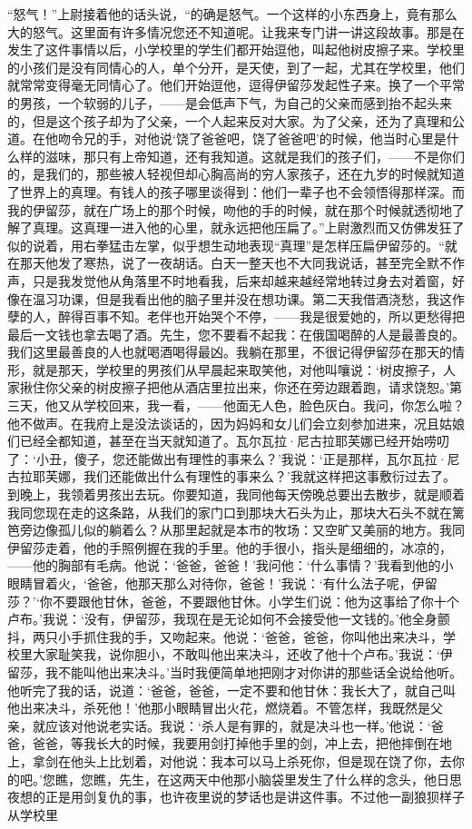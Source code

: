 \par “怒气！”上尉接着他的话头说，“的确是怒气。一个这样的小东西身上，竟有那么大的怒气。这里面有许多情况您还不知道呢。让我来专门讲一讲这段故事。那是在发生了这件事情以后，小学校里的学生们都开始逗他，叫起他树皮擦子来。学校里的小孩们是没有同情心的人，单个分开，是天使，到了一起，尤其在学校里，他们就常常变得毫无同情心了。他们开始逗他，逗得伊留莎发起性子来。换了一个平常的男孩，一个软弱的儿子，——是会低声下气，为自己的父亲而感到抬不起头来的，但是这个孩子却为了父亲，一个人起来反对大家。为了父亲，还为了真理和公道。在他吻令兄的手，对他说‘饶了爸爸吧，饶了爸爸吧’的时候，他当时心里是什么样的滋味，那只有上帝知道，还有我知道。这就是我们的孩子们，——不是你们的，是我们的，那些被人轻视但却心胸高尚的穷人家孩子，还在九岁的时候就知道了世界上的真理。有钱人的孩子哪里谈得到：他们一辈子也不会领悟得那样深。而我的伊留莎，就在广场上的那个时候，吻他的手的时候，就在那个时候就透彻地了解了真理。这真理一进入他的心里，就永远把他压扁了。”上尉激烈而又仿佛发狂了似的说着，用右拳猛击左掌，似乎想生动地表现“真理”是怎样压扁伊留莎的。“就在那天他发了寒热，说了一夜胡话。白天一整天也不大同我说话，甚至完全默不作声，只是我发觉他从角落里不时地看我，后来却越来越经常地转过身去对着窗，好像在温习功课，但是我看出他的脑子里并没在想功课。第二天我借酒浇愁，我这作孽的人，醉得百事不知。老伴也开始哭个不停，——我是很爱她的，所以更愁得把最后一文钱也拿去喝了酒。先生，您不要看不起我：在俄国喝醉的人是最善良的。我们这里最善良的人也就喝酒喝得最凶。我躺在那里，不很记得伊留莎在那天的情形，就是那天，学校里的男孩们从早晨起来取笑他，对他叫嚷说：‘树皮擦子，人家揪住你父亲的树皮擦子把他从酒店里拉出来，你还在旁边跟着跑，请求饶恕。’第三天，他又从学校回来，我一看，——他面无人色，脸色灰白。我问，你怎么啦？他不做声。在我府上是没法谈话的，因为妈妈和女儿们会立刻参加进来，况且姑娘们已经全都知道，甚至在当天就知道了。瓦尔瓦拉·尼古拉耶芙娜已经开始唠叨了：‘小丑，傻子，您还能做出有理性的事来么？’我说：‘正是那样，瓦尔瓦拉·尼古拉耶芙娜，我们还能做出什么有理性的事来么？’我就这样把这事敷衍过去了。到晚上，我领着男孩出去玩。你要知道，我同他每天傍晚总要出去散步，就是顺着我同您现在走的这条路，从我们的家门口到那块大石头为止，那块大石头不就在篱笆旁边像孤儿似的躺着么？从那里起就是本市的牧场：又空旷又美丽的地方。我同伊留莎走着，他的手照例握在我的手里。他的手很小，指头是细细的，冰凉的，——他的胸部有毛病。他说：‘爸爸，爸爸！’我问他：‘什么事情？’我看到他的小眼睛冒着火，‘爸爸，他那天那么对待你，爸爸！’我说：‘有什么法子呢，伊留莎？’‘你不要跟他甘休，爸爸，不要跟他甘休。小学生们说：他为这事给了你十个卢布。’我说：‘没有，伊留莎，我现在是无论如何不会接受他一文钱的。’他全身颤抖，两只小手抓住我的手，又吻起来。他说：‘爸爸，爸爸，你叫他出来决斗，学校里大家耻笑我，说你胆小，不敢叫他出来决斗，还收了他十个卢布。’我说：‘伊留莎，我不能叫他出来决斗。’当时我便简单地把刚才对你讲的那些话全说给他听。他听完了我的话，说道：‘爸爸，爸爸，一定不要和他甘休：我长大了，就自己叫他出来决斗，杀死他！’他那小眼睛冒出火花，燃烧着。不管怎样，我既然是父亲，就应该对他说老实话。我说：‘杀人是有罪的，就是决斗也一样。’他说：‘爸爸，爸爸，等我长大的时候，我要用剑打掉他手里的剑，冲上去，把他摔倒在地上，拿剑在他头上比划着，对他说：我本可以马上杀死你，但是现在饶了你，去你的吧。’您瞧，您瞧，先生，在这两天中他那小脑袋里发生了什么样的念头，他日思夜想的正是用剑复仇的事，也许夜里说的梦话也是讲这件事。不过他一副狼狈样子从学校里